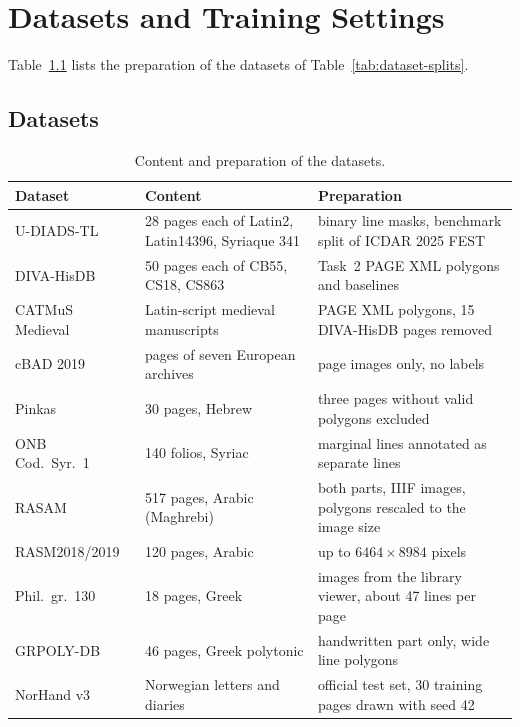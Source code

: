 \chapter{Datasets and Training Settings}
\label{app:setup}

Table~\ref{tab:app-datasets} lists the preparation of the datasets of Table~\ref{tab:dataset-splits}.

\section{Datasets}
\label{app:datasets}

\begin{table}[htbp]
    \centering
    \caption{Content and preparation of the datasets.}
    \label{tab:app-datasets}
    \scriptsize
    \setlength{\tabcolsep}{3pt}
    \renewcommand{\arraystretch}{0.92}
    \begin{tabular*}{\textwidth}{@{\extracolsep{\fill}}lp{}p{}@{}}
        \toprule
        Dataset & Content & Preparation \\
        \midrule
        U-DIADS-TL~\cite{Zottin_2025_FEST} & 28 pages each of Latin2, Latin14396, Syriaque 341 & binary line masks, benchmark split of ICDAR 2025 FEST \\
        DIVA-HisDB~\cite{diva_hisdb} & 50 pages each of CB55, CS18, CS863 & Task~2 PAGE XML polygons and baselines \\
        CATMuS Medieval~\cite{catmus-medieval} & Latin-script medieval manuscripts & PAGE XML polygons, 15 DIVA-HisDB pages removed \\
        cBAD 2019~\cite{cbad-2019} & pages of seven European archives & page images only, no labels \\
        \midrule
        Pinkas~\cite{Barakat2019Pinkas} & 30 pages, Hebrew & three pages without valid polygons excluded \\
        ONB Cod.\ Syr.\ 1~\cite{AboudIshac2025ONBSyr1} & 140 folios, Syriac & marginal lines annotated as separate lines \\
        RASAM~\cite{VidalGorene2021RASAM} & 517 pages, Arabic (Maghrebi) & both parts, IIIF images, polygons rescaled to the image size \\
        RASM2018/2019~\cite{KeinanSchoonbaert2019RASM} & 120 pages, Arabic & up to \(6464\times8984\) pixels \\
        Phil.\ gr.\ 130~\cite{SindlevAndersen2026PhilGrGT} & 18 pages, Greek & images from the library viewer, about 47 lines per page \\
        GRPOLY-DB~\cite{Gatos2015GRPOLY} & 46 pages, Greek polytonic & handwritten part only, wide line polygons \\
        NorHand v3~\cite{Beyer2023NorHand} & Norwegian letters and diaries & official test set, 30 training pages drawn with seed 42 \\
        \bottomrule
    \end{tabular*}
\end{table}

